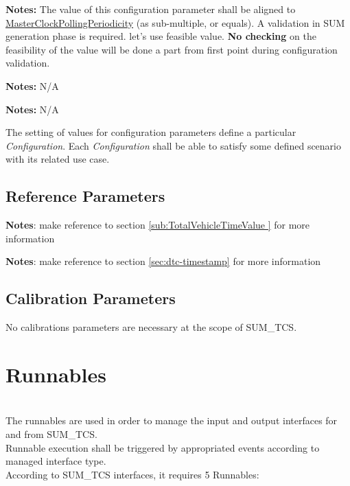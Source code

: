 \label{conf:TimeManagementPeriodicity}
\newline
{\textbf{Notes:} The value of this configuration parameter shall be aligned to \hyperref[conf:MasterClockPollingPeriodicity]{MasterClockPollingPeriodicity} (as sub-multiple, or equals). A validation in SUM generation phase is required.
let's use feasible value. \textbf{No checking} on the feasibility of the value will be done a part from first point during configuration validation.}
\newline

\label{conf:TcsGenerateInitRunnable}
\newline
{\textbf{Notes:} N/A}
\newline

\label{conf:TcsInitFuncPeriodicity}
\newline
{\textbf{Notes:} N/A}
\newline

The setting of values for configuration parameters define a particular \textit{Configuration}. Each \textit{Configuration} shall be able to satisfy some defined scenario with its related use case.

\subsection{Reference Parameters}
\label{sec:refparams}

\newline
{\textbf{Notes}: make reference to section \ref{sub:TotalVehicleTimeValue } for more information}


\newline
{\textbf{Notes}: make reference to section \ref{sec:dtc-timestamp} for more information}

\subsection{Calibration Parameters}
No calibrations parameters are necessary at the scope of SUM\_TCS.

\section{Runnables}
\label{sec:Runnables}
\\
The runnables are used in order to manage the input and output interfaces for and from SUM\_TCS.
\\
Runnable execution shall be triggered by appropriated events according to managed interface type.
\\
According to SUM\_TCS interfaces, it requires 5 Runnables:
\\
{}

